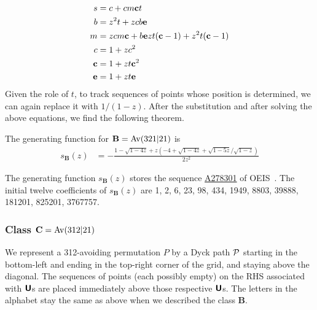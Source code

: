 \begin{align*}
s &= c + cm\bc t\\
b &= z^2t + zcb\be\\
m &= zcm\bc + b\be zt(\bc -1) + z^2t(\bc -1)\\
c &= 1+zc^2\\
\bc &= 1+ zt\bc^2\\
\be &= 1+zt\be
\end{align*}
Given the role of $t$, to track sequences of points whose position is determined, we can again replace it with $1/(1-z)$. After the substitution and after solving the above equations, we find the following theorem.
\begin{theorem}
The generating function for $\mathbf{B} = \Av(321|21)$ is 
\begin{align*}
  s_{\mathbf{B}}(z) &= -\frac{1-\sqrt{1-4z} + z(-4+\sqrt{1-4z} + \sqrt{1-5z}/\sqrt{1-z})}{2z^2}
\end{align*}
\end{theorem}

The generating function $s_{\mathbf{B}}(z)$ stores the sequence \href{http://oeis.org/A278301}{A278301} of OEIS~\cite{oeis}. The initial twelve coefficients of $s_{\mathbf{B}}(z)$ are 1, 2, 6, 23, 98, 434, 1949, 8803, 39888, 181201, 825201, 3767757.

\subsubsection{Class $\mathbf{C} = \Av(312|21)$}
\label{sec:classC}
We represent a 312-avoiding permutation $P$ by a Dyck path $\P$ starting in the bottom-left and ending in the top-right corner of the grid, and staying above the diagonal. The sequences of points (each possibly empty) on the RHS associated with $\bU$s are placed immediately above those respective $\bU$s. The letters in the alphabet stay the same as above when we described the class $\mathbf{B}$.

